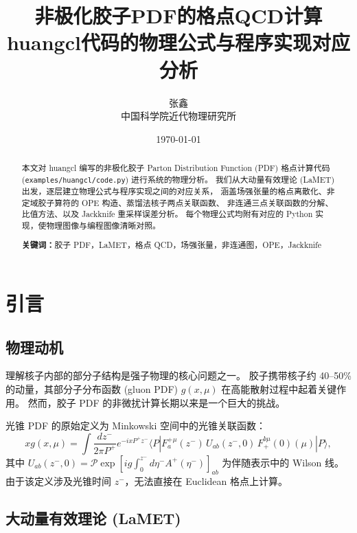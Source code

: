 \documentclass[12pt,a4paper]{ctexart}
\title{\textbf{非极化胶子PDF的格点QCD计算}\\[0.3cm]
       \large huangcl代码的物理公式与程序实现对应分析}
\author{张鑫 \\ 中国科学院近代物理研究所}
\date{\today}
\begin{document}
\maketitle

\begin{abstract}
本文对 huangcl 编写的非极化胶子 Parton Distribution Function (PDF) 格点计算代码
(\texttt{examples/huangcl/code.py}) 进行系统的物理分析。
我们从大动量有效理论 (LaMET) 出发，逐层建立物理公式与程序实现之间的对应关系，
涵盖场强张量的格点离散化、非定域胶子算符的 OPE 构造、蒸馏法核子两点关联函数、
非连通三点关联函数的分解、比值方法、以及 Jackknife 重采样误差分析。
每个物理公式均附有对应的 Python 实现，使物理图像与编程图像清晰对照。

\textbf{关键词：}胶子 PDF，LaMET，格点 QCD，场强张量，非连通图，OPE，Jackknife
\end{abstract}

\newpage
\tableofcontents
\newpage

\section{引言}

\subsection{物理动机}

理解核子内部的部分子结构是强子物理的核心问题之一。
胶子携带核子约 40--50\% 的动量，其部分子分布函数 (gluon PDF) $g(x,\mu)$
在高能散射过程中起着关键作用。
然而，胶子 PDF 的非微扰计算长期以来是一个巨大的挑战。

光锥 PDF 的原始定义为 Minkowski 空间中的光锥关联函数\cite{gluon_pdf_derivation}：
\begin{equation}\label{eq:lightcone_pdf}
x g(x, \mu) = \int \frac{dz^{-}}{2\pi P^{+}} e^{-i x P^{+} z^{-}}
    \langle P | F^{+\mu}_{a}(z^{-}) \, U_{ab}(z^{-}, 0) \,
    F^{b\mu}_{+}(0) (\mu) | P \rangle,
\end{equation}
其中 $U_{ab}(z^{-}, 0) = \mathcal{P}\exp[ig\int_{0}^{z^{-}} d\eta^{-} A^{+}(\eta^{-})]_{ab}$
为伴随表示中的 Wilson 线。
由于该定义涉及光锥时间 $z^{-}$，无法直接在 Euclidean 格点上计算。

\subsection{大动量有效理论 (LaMET)}
\end{document}
